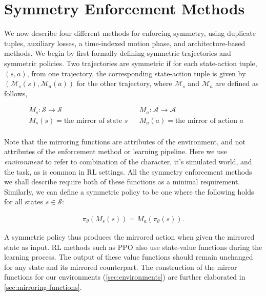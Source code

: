 \section{Symmetry Enforcement Methods}
\label{sec:methods}
We now describe four different methods for enforcing symmetry, using duplicate tuples, auxiliary losses, 
a time-indexed motion phase, and architecture-based methods.  
We begin by first formally defining symmetric trajectories and symmetric policies.  
Two trajectories are symmetric if for each state-action tuple, $(s,a)$, from one trajectory, 
the corresponding state-action tuple is given by $(\mathcal{M}_s(s), \mathcal{M}_a(a))$ 
for the other trajectory, where $\mathcal{M}_s$ and $\mathcal{M}_a$ are defined as follows,

\begin{align*}
    &M_s: \mathcal{S} \to \mathcal{S} &  &M_a: \mathcal{A} \to \mathcal{A}\\
    &M_s(s) = \text{the mirror of state } s & &M_a(a) = \text{the mirror of action } a\\
\end{align*}

Note that the mirroring functions are attributes of the environment, and
not attributes of the enforcement method or learning pipeline.  Here we use {\em environment}
to refer to combination of the character, it's simulated world, and the task, as is common
in RL settings.
All the symmetry enforcement methods we shall describe
require both of these functions as a minimal requirement.  
Similarly, we can define a symmetric policy to be one where the following holds
for all states $s \in \mathcal{S}$:

\begin{align}
    \pi_\theta(M_s(s)) = M_a(\pi_\theta(s)).
    \label{eq:symmetric-policy}
\end{align}

A symmetric policy thus produces the mirrored action when given the mirrored state as input. 
RL methods such as PPO also use state-value functions during the learning process.  
The output of these value functions should remain unchanged for any state and its mirrored counterpart.  
The construction of the mirror functions for our environments (\autoref{sec:environments}) are further 
elaborated in \autoref{sec:mirroring-functions}.

